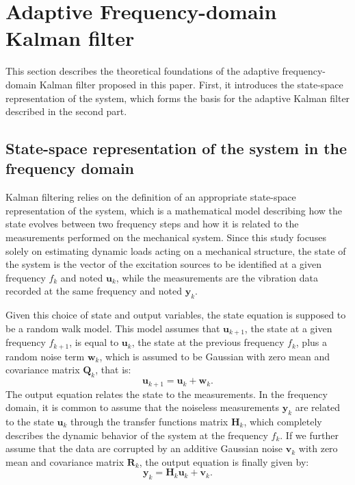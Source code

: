 \documentclass[5p,12pt]{elsarticle}
\begin{document}
\section{Adaptive Frequency-domain Kalman filter}\label{s:kalman}

This section describes the theoretical foundations of the adaptive frequency-domain Kalman filter proposed in this paper. First, it introduces the state-space representation of the system, which forms the basis for the adaptive Kalman filter described in the second part.

\subsection{State-space representation of the system in the frequency domain}\label{s:state_space}

Kalman filtering relies on the definition of an appropriate state-space representation of the system, which is a mathematical model describing how the state evolves between two frequency steps and how it is related to the measurements performed on the mechanical system. Since this study focuses solely on estimating dynamic loads acting on a mechanical structure, the state of the system is the vector of the excitation sources to be identified at a given frequency $f_k$ and noted $\mathbf{u}_k$, while the measurements are the vibration data recorded at the same frequency and noted $\mathbf{y}_k$. \bigskip

Given this choice of state and output variables, the state equation is supposed to be a random walk model. This model assumes that $\mathbf{u}_{k+1}$, the state at a given frequency $f_{k+1}$, is equal to $\mathbf{u}_k$, the state at the previous frequency $f_k$, plus a random noise term $\mathbf{w}_k$, which is assumed to be Gaussian with zero mean and covariance matrix $\mathbf{Q}_k$, that is:
\begin{equation}\label{eq:state_eq}
	\mathbf{u}_{k+1} = \mathbf{u}_k + \mathbf{w}_k.
\end{equation}
The output equation relates the state to the measurements. In the frequency domain, it is common to assume that the noiseless measurements $\mathbf{y}_k$ are related to the state $\mathbf{u}_k$ through the transfer functions matrix $\mathbf{H}_k$, which completely describes the dynamic behavior of the system at the frequency $f_k$. If we further assume that the data are corrupted by an additive Gaussian noise $\mathbf{v}_k$ with zero mean and covariance matrix $\mathbf{R}_k$, the output equation is finally given by:
\begin{equation}\label{eq:output_eq}
	\mathbf{y}_k = \mathbf{H}_k \mathbf{u}_k + \mathbf{v}_k.
\end{equation}
\end{document}
